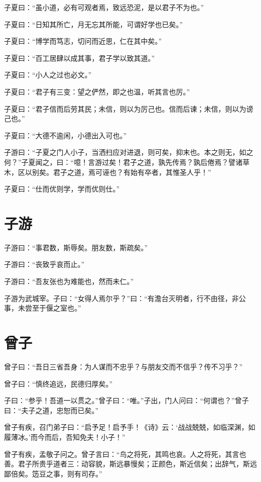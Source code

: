 \documentclass[a5paper]{ctexbook}
\begin{document}
    子夏曰：“虽小道，必有可观者焉，致远恐泥，是以君子不为也。”
    
    子夏曰：“日知其所亡，月无忘其所能，可谓好学也已矣。”
    
    子夏曰：“博学而笃志，切问而近思，仁在其中矣。”

    子夏曰：“百工居肆以成其事，君子学以致其道。”
    
    子夏曰：“小人之过也必文。”
    
    子夏曰：“君子有三变：望之俨然，即之也温，听其言也厉。”

    子夏曰：“君子信而后劳其民；未信，则以为厉己也。信而后谏；未信，则以为谤己也。”
    
    子夏曰：“大德不逾闲，小德出入可也。”
    
    子游曰：“子夏之门人小子，当洒扫应对进退，则可矣，抑末也。本之则无，如之何？”子夏闻之，曰：“噫！言游过矣！君子之道，孰先传焉？孰后倦焉？譬诸草木，区以别矣。君子之道，焉可诬也？有始有卒者，其惟圣人乎！”

    子夏曰：“仕而优则学，学而优则仕。”

    \chapter{子游}

    子游曰：“事君数，斯辱矣。朋友数，斯疏矣。”

    子游曰：“丧致乎哀而止。”
    
    子游曰：“吾友张也为难能也，然而未仁。”

    子游为武城宰。子曰：“女得人焉尔乎？”曰：“有澹台灭明者，行不由径，非公事，未尝至于偃之室也。”

    \chapter{曾子}

    曾子曰：“吾日三省吾身：为人谋而不忠乎？与朋友交而不信乎？传不习乎？”

    曾子曰：“慎终追远，民德归厚矣。”

    子曰：“参乎！吾道一以贯之。”曾子曰：“唯。”子出，门人问曰：“何谓也？”曾子曰：“夫子之道，忠恕而已矣。”

    曾子有疾，召门弟子曰：“启予足！启予手！《诗》云：‘战战兢兢，如临深渊，如履薄冰。’而今而后，吾知免夫！小子！”

    曾子有疾，孟敬子问之。曾子言曰：“鸟之将死，其鸣也哀。人之将死，其言也善。君子所贵乎道者三：动容貌，斯远暴慢矣；正颜色，斯近信矣；出辞气，斯远鄙倍矣。笾豆之事，则有司存。”
\end{document}

